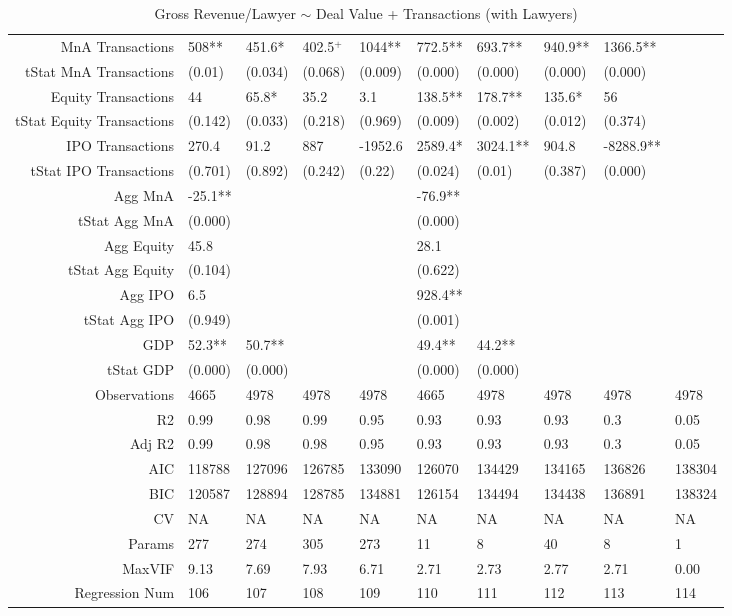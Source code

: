 \begin{table}[ht]
\begin{tabular}{rlllllllll}
  MnA Transactions & 508** & 451.6* & 402.5$^{+}$ & 1044** & 772.5** & 693.7** & 940.9** & 1366.5** &  \\ 
  tStat MnA Transactions & (0.01) & (0.034) & (0.068) & (0.009) & (0.000) & (0.000) & (0.000) & (0.000) &  \\ 
  Equity Transactions & 44 & 65.8* & 35.2 & 3.1 & 138.5** & 178.7** & 135.6* & 56 &  \\ 
  tStat Equity Transactions & (0.142) & (0.033) & (0.218) & (0.969) & (0.009) & (0.002) & (0.012) & (0.374) &  \\ 
  IPO Transactions & 270.4 & 91.2 & 887 & -1952.6 & 2589.4* & 3024.1** & 904.8 & -8288.9** &  \\ 
  tStat IPO Transactions & (0.701) & (0.892) & (0.242) & (0.22) & (0.024) & (0.01) & (0.387) & (0.000) &  \\ 
  Agg MnA & -25.1** &  &  &  & -76.9** &  &  &  &  \\ 
  tStat Agg MnA & (0.000) &  &  &  & (0.000) &  &  &  &  \\ 
  Agg Equity & 45.8 &  &  &  & 28.1 &  &  &  &  \\ 
  tStat Agg Equity & (0.104) &  &  &  & (0.622) &  &  &  &  \\ 
  Agg IPO & 6.5 &  &  &  & 928.4** &  &  &  &  \\ 
  tStat Agg IPO & (0.949) &  &  &  & (0.001) &  &  &  &  \\ 
  GDP & 52.3** & 50.7** &  &  & 49.4** & 44.2** &  &  &  \\ 
  tStat GDP & (0.000) & (0.000) &  &  & (0.000) & (0.000) &  &  &  \\ 
  Observations & 4665 & 4978 & 4978 & 4978 & 4665 & 4978 & 4978 & 4978 & 4978 \\ 
  R2 & 0.99 & 0.98 & 0.99 & 0.95 & 0.93 & 0.93 & 0.93 & 0.3 & 0.05 \\ 
  Adj R2 & 0.99 & 0.98 & 0.98 & 0.95 & 0.93 & 0.93 & 0.93 & 0.3 & 0.05 \\ 
  AIC & 118788 & 127096 & 126785 & 133090 & 126070 & 134429 & 134165 & 136826 & 138304 \\ 
  BIC & 120587 & 128894 & 128785 & 134881 & 126154 & 134494 & 134438 & 136891 & 138324 \\ 
  CV & NA & NA & NA & NA & NA & NA & NA & NA & NA \\ 
  Params & 277 & 274 & 305 & 273 & 11 & 8 & 40 & 8 & 1 \\ 
  MaxVIF & 9.13 & 7.69 & 7.93 & 6.71 & 2.71 & 2.73 & 2.77 & 2.71 & 0.00 \\ 
  Regression Num & 106 & 107 & 108 & 109 & 110 & 111 & 112 & 113 & 114 \\ 
   \hline
\end{tabular}
\caption{Gross Revenue/Lawyer $\sim$ Deal Value + Transactions (with Lawyers)} 
\end{table}
